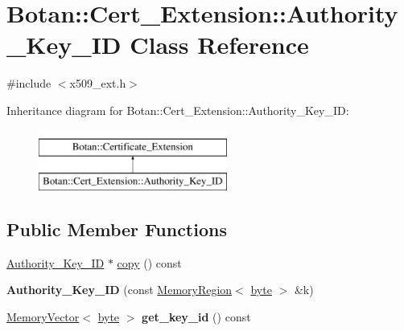 \hypertarget{classBotan_1_1Cert__Extension_1_1Authority__Key__ID}{\section{Botan\-:\-:Cert\-\_\-\-Extension\-:\-:Authority\-\_\-\-Key\-\_\-\-I\-D Class Reference}
\label{classBotan_1_1Cert__Extension_1_1Authority__Key__ID}
}


{\ttfamily \#include $<$x509\-\_\-ext.\-h$>$}

Inheritance diagram for Botan\-:\-:Cert\-\_\-\-Extension\-:\-:Authority\-\_\-\-Key\-\_\-\-I\-D\-:\begin{figure}[H]
\begin{center}
\leavevmode
\includegraphics[height=2.000000cm]{classBotan_1_1Cert__Extension_1_1Authority__Key__ID}
\end{center}
\end{figure}
\subsection*{Public Member Functions}
\begin{DoxyCompactItemize}
\item 
\hyperlink{classBotan_1_1Cert__Extension_1_1Authority__Key__ID}{Authority\-\_\-\-Key\-\_\-\-I\-D} $\ast$ \hyperlink{classBotan_1_1Cert__Extension_1_1Authority__Key__ID_a7a185f68e6a575d32446319e446f3b9e}{copy} () const 
\item 
\hypertarget{classBotan_1_1Cert__Extension_1_1Authority__Key__ID_a73e91ebaa7d72ac804b32c9ad6d91685}{{\bfseries Authority\-\_\-\-Key\-\_\-\-I\-D} (const \hyperlink{classBotan_1_1MemoryRegion}{Memory\-Region}$<$ \hyperlink{namespaceBotan_a7d793989d801281df48c6b19616b8b84}{byte} $>$ \&k)}\label{classBotan_1_1Cert__Extension_1_1Authority__Key__ID_a73e91ebaa7d72ac804b32c9ad6d91685}

\item 
\hypertarget{classBotan_1_1Cert__Extension_1_1Authority__Key__ID_a37016638a4d39ebc0f5e88ed23d0e529}{\hyperlink{classBotan_1_1MemoryVector}{Memory\-Vector}$<$ \hyperlink{namespaceBotan_a7d793989d801281df48c6b19616b8b84}{byte} $>$ {\bfseries get\-\_\-key\-\_\-id} () const }\label{classBotan_1_1Cert__Extension_1_1Authority__Key__ID_a37016638a4d39ebc0f5e88ed23d0e529}

\end{DoxyCompactItemize}


